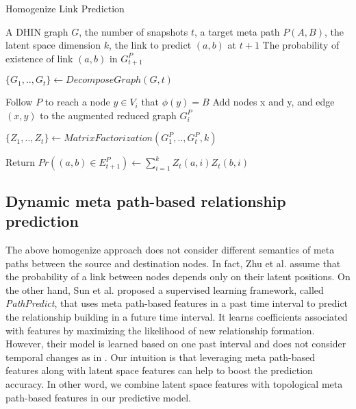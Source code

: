 \begin{algorithm}[t]
\caption{Homogenize Link Prediction}\label{alg1}
\begin{algorithmic}[1]%
\REQUIRE A DHIN graph $G$, the number of snapshots $t$, a target meta path $P(A,B)$, the latent space dimension $k$, the link to predict $(a,b)$ at $t+1$
\ENSURE The probability of existence of link $(a,b)$ in $G^P_{t+1}$

\STATE $\{G_1, .., G_t\} \leftarrow DecomposeGraph(G, t)$

    
        \STATE Follow $P$ to reach a node $y\in V_i$ that $\phi(y)=B$%
        \STATE Add nodes x and y, and edge $(x,y)$ to the augmented reduced graph $G_i^P$ 
\ENDFOR

\ENDFOR
\STATE $\{Z_1, .., Z_t\} \leftarrow MatrixFactorization(G^P_1, .., G^P_t, k)$

\STATE Return $Pr((a,b)\in E^P_{t+1}) \leftarrow \sum_{i=1}^{k} Z_t(a,i)Z_t(b,i)$


\end{algorithmic}
\end{algorithm}



\subsection{Dynamic meta path-based relationship prediction}

The above homogenize approach does not consider different semantics of meta paths between the source and destination nodes. In fact, Zhu et al. \cite{Zhu2016} assume that the probability of a link between nodes depends only on their latent positions. On the other hand, Sun et al. \cite{sun2011ASONAM} proposed a supervised learning framework, called \textit{PathPredict}, that uses meta path-based features in a past time interval to predict the relationship building in a future time interval. It learns coefficients associated with features by maximizing the likelihood of new relationship formation. However, their model is learned based on one past interval and does not consider temporal changes as in \cite{Zhu2016}. Our intuition is that leveraging meta path-based features along with latent space features can help to boost the prediction accuracy. In other word, we combine latent space features with topological meta path-based features in our predictive model.


